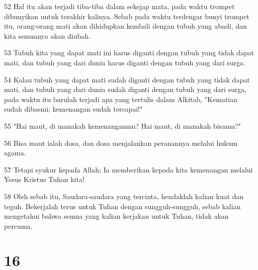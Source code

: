 \par 52 Hal itu akan terjadi tiba-tiba dalam sekejap mata, pada waktu trompet dibunyikan untuk terakhir kalinya. Sebab pada waktu terdengar bunyi trompet itu, orang-orang mati akan dihidupkan kembali dengan tubuh yang abadi, dan kita semuanya akan diubah.
\par 53 Tubuh kita yang dapat mati ini harus diganti dengan tubuh yang tidak dapat mati, dan tubuh yang dari dunia harus diganti dengan tubuh yang dari surga.
\par 54 Kalau tubuh yang dapat mati sudah diganti dengan tubuh yang tidak dapat mati, dan tubuh yang dari dunia sudah diganti dengan tubuh yang dari surga, pada waktu itu barulah terjadi apa yang tertulis dalam Alkitab, "Kematian sudah dibasmi; kemenangan sudah tercapai!"
\par 55 "Hai maut, di manakah kemenanganmu? Hai maut, di manakah bisamu?"
\par 56 Bisa maut ialah dosa, dan dosa menjalankan peranannya melalui hukum agama.
\par 57 Tetapi syukur kepada Allah; Ia memberikan kepada kita kemenangan melalui Yesus Kristus Tuhan kita!
\par 58 Oleh sebab itu, Saudara-saudara yang tercinta, hendaklah kalian kuat dan teguh. Bekerjalah terus untuk Tuhan dengan sungguh-sungguh, sebab kalian mengetahui bahwa semua yang kalian kerjakan untuk Tuhan, tidak akan percuma.

\chapter{16}

